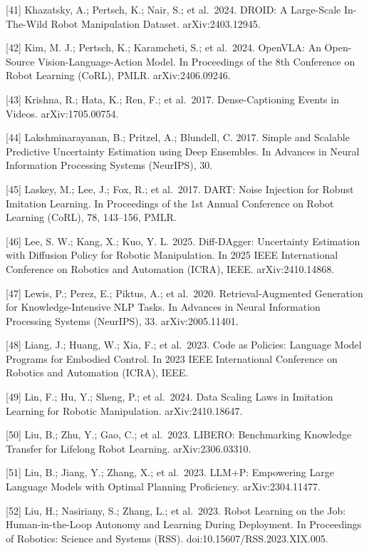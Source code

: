 \documentclass[
  11pt,
]{article}
\begin{document}
{[}41{]} Khazatsky, A.; Pertsch, K.; Nair, S.; et al.~2024. DROID: A
Large-Scale In-The-Wild Robot Manipulation Dataset. arXiv:2403.12945.

{[}42{]} Kim, M. J.; Pertsch, K.; Karamcheti, S.; et al.~2024. OpenVLA:
An Open-Source Vision-Language-Action Model. In Proceedings of the 8th
Conference on Robot Learning (CoRL), PMLR. arXiv:2406.09246.

{[}43{]} Krishna, R.; Hata, K.; Ren, F.; et al.~2017. Dense-Captioning
Events in Videos. arXiv:1705.00754.

{[}44{]} Lakshminarayanan, B.; Pritzel, A.; Blundell, C. 2017. Simple
and Scalable Predictive Uncertainty Estimation using Deep Ensembles. In
Advances in Neural Information Processing Systems (NeurIPS), 30.

{[}45{]} Laskey, M.; Lee, J.; Fox, R.; et al.~2017. DART: Noise
Injection for Robust Imitation Learning. In Proceedings of the 1st
Annual Conference on Robot Learning (CoRL), 78, 143--156, PMLR.

{[}46{]} Lee, S. W.; Kang, X.; Kuo, Y. L. 2025. Diff-DAgger: Uncertainty
Estimation with Diffusion Policy for Robotic Manipulation. In 2025 IEEE
International Conference on Robotics and Automation (ICRA), IEEE.
arXiv:2410.14868.

{[}47{]} Lewis, P.; Perez, E.; Piktus, A.; et al.~2020.
Retrieval-Augmented Generation for Knowledge-Intensive NLP Tasks. In
Advances in Neural Information Processing Systems (NeurIPS), 33.
arXiv:2005.11401.

{[}48{]} Liang, J.; Huang, W.; Xia, F.; et al.~2023. Code as Policies:
Language Model Programs for Embodied Control. In 2023 IEEE International
Conference on Robotics and Automation (ICRA), IEEE.

{[}49{]} Lin, F.; Hu, Y.; Sheng, P.; et al.~2024. Data Scaling Laws in
Imitation Learning for Robotic Manipulation. arXiv:2410.18647.

{[}50{]} Liu, B.; Zhu, Y.; Gao, C.; et al.~2023. LIBERO: Benchmarking
Knowledge Transfer for Lifelong Robot Learning. arXiv:2306.03310.

{[}51{]} Liu, B.; Jiang, Y.; Zhang, X.; et al.~2023. LLM+P: Empowering
Large Language Models with Optimal Planning Proficiency.
arXiv:2304.11477.

{[}52{]} Liu, H.; Nasiriany, S.; Zhang, L.; et al.~2023. Robot Learning
on the Job: Human-in-the-Loop Autonomy and Learning During Deployment.
In Proceedings of Robotics: Science and Systems (RSS).
doi:10.15607/RSS.2023.XIX.005.
\end{document}

